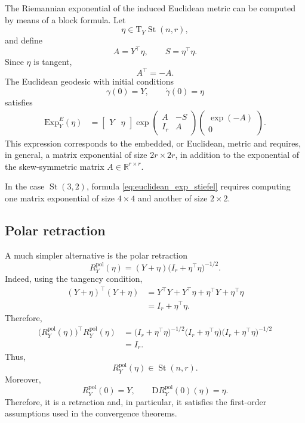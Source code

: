 \documentclass[11pt]{article}
\newcommand{\R}{\mathbb{R}}
\newcommand{\T}{\mathrm{T}}
\newcommand{\D}{\mathrm{D}}
\newcommand{\Exp}{\mathrm{Exp}}
\begin{document}
The Riemannian exponential of the induced Euclidean metric can be
computed by means of a block formula. Let
\[
    \eta\in \T_Y\operatorname{St}(n,r),
\]
and define
\[
    A=Y^\top\eta,
    \qquad
    S=\eta^\top\eta.
\]
Since $\eta$ is tangent,
\[
    A^\top=-A.
\]
The Euclidean geodesic with initial conditions
\[
    \gamma(0)=Y,
    \qquad
    \dot\gamma(0)=\eta
\]
satisfies
\begin{equation}\label{eq:euclidean_exp_stiefel}
\begin{aligned}
    \Exp^{E}_Y(\eta)
    &=
    \begin{bmatrix}
        Y&\eta
    \end{bmatrix}
    \exp
    \begin{pmatrix}
        A&-S\\
        I_r&A
    \end{pmatrix}
    \begin{pmatrix}
        \exp(-A)\\
        0
    \end{pmatrix}.
\end{aligned}
\end{equation}
This expression corresponds to the embedded, or Euclidean, metric and requires,
in general, a matrix exponential of size $2r\times2r$, in addition to
the exponential of the skew-symmetric matrix $A\in\R^{r\times r}$.

In the case $\operatorname{St}(3,2)$, formula
\eqref{eq:euclidean_exp_stiefel} requires computing one matrix exponential of
size $4\times4$ and another of size $2\times2$.

\subsection*{Polar retraction}

A much simpler alternative is the polar retraction
\begin{equation}\label{eq:polar_retraction_stiefel}
    R_Y^{\mathrm{pol}}(\eta)
    =
    (Y+\eta)
    \bigl(I_r+\eta^\top\eta\bigr)^{-1/2}.
\end{equation}
Indeed, using the tangency condition,
\[
\begin{aligned}
    (Y+\eta)^\top(Y+\eta)
    &=
    Y^\top Y
    +
    Y^\top\eta
    +
    \eta^\top Y
    +
    \eta^\top\eta\\
    &=
    I_r+\eta^\top\eta.
\end{aligned}
\]
Therefore,
\[
\begin{aligned}
    \bigl(R_Y^{\mathrm{pol}}(\eta)\bigr)^\top
    R_Y^{\mathrm{pol}}(\eta)
    &=
    \bigl(I_r+\eta^\top\eta\bigr)^{-1/2}
    \bigl(I_r+\eta^\top\eta\bigr)
    \bigl(I_r+\eta^\top\eta\bigr)^{-1/2}\\
    &=I_r.
\end{aligned}
\]
Thus,
\[
    R_Y^{\mathrm{pol}}(\eta)
    \in
    \operatorname{St}(n,r).
\]
Moreover,
\[
    R_Y^{\mathrm{pol}}(0)=Y,
    \qquad
    \D R_Y^{\mathrm{pol}}(0)(\eta)=\eta.
\]
Therefore, it is a retraction and, in particular, it satisfies the first-order
assumptions used in the convergence theorems.
\end{document}
